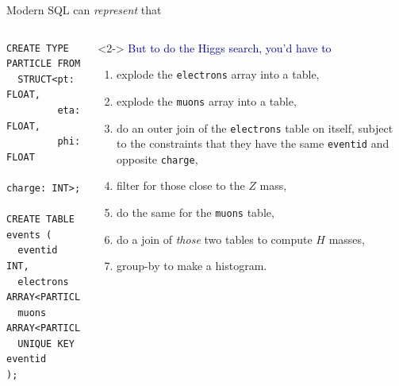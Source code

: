 \documentclass[aspectratio=169]{beamer}
\begin{document}
\begin{frame}[fragile]{Modern SQL can {\it represent} that}
\vspace{0.5 cm}
\begin{columns}
\small
\begin{verbatim}
CREATE TYPE PARTICLE FROM
  STRUCT<pt: FLOAT,
         eta: FLOAT,
         phi: FLOAT
         charge: INT>;

CREATE TABLE events (
  eventid   INT,
  electrons ARRAY<PARTICLE>,
  muons     ARRAY<PARTICLE>,
  UNIQUE KEY eventid
);
\end{verbatim}

\vspace{0.5 cm}

\begin{uncoverenv}<2->
\textcolor{darkblue}{But to do the Higgs search, you'd have to}
\begin{enumerate}
\item explode the {\tt\small electrons} array into a table,
\item explode the {\tt\small muons} array into a table,
\item do an outer join of the {\tt\small electrons} table on itself, subject to the constraints that they have the same {\tt\small eventid} and opposite {\tt\small charge},
\item filter for those close to the $Z$ mass,
\item do the same for the {\tt\small muons} table,
\item do a join of {\it those} two tables to compute $H$ masses,
\item group-by to make a histogram.
\end{enumerate}
\end{uncoverenv}

\vspace{0.25 cm}
\end{columns}
\end{frame}
\end{document}
